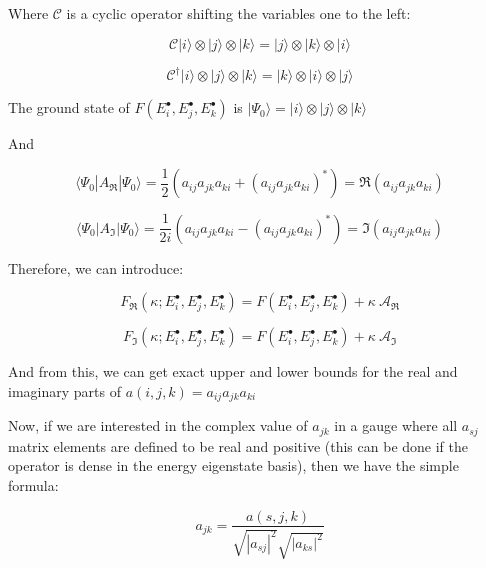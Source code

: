 \documentclass{article}
\theoremstyle{definition}
\begin{document}
Where $\mathcal{C}$ is a cyclic operator shifting the variables one to the left:

\begin{equation}
\mathcal{C} |i\rangle \otimes |j\rangle \otimes  |k\rangle
=
|j\rangle \otimes  |k\rangle \otimes |i\rangle
\end{equation}

\begin{equation}
\mathcal{C}^\dagger |i\rangle \otimes |j\rangle \otimes  |k\rangle
=
|k\rangle \otimes |i\rangle \otimes  |j\rangle
\end{equation}

The ground state of $F(E_i^\bullet,E_j^\bullet,E_k^\bullet)$ is $|\Psi_0 \rangle = |i\rangle \otimes |j\rangle \otimes  |k\rangle$

And

\begin{equation}
\langle \Psi_0 | A_\Re | \Psi_0 \rangle
=
\frac{1}{2}
\left (
a_{ij} a_{jk} a_{ki}
+
(a_{ij} a_{jk} a_{ki})^*
\right )
=
\Re(a_{ij} a_{jk} a_{ki})
\end{equation}

\begin{equation}
\langle \Psi_0 | A_\Im | \Psi_0 \rangle
=
\frac{1}{2i}
\left (
a_{ij} a_{jk} a_{ki}
-
(a_{ij} a_{jk} a_{ki})^*
\right )
=
\Im(a_{ij} a_{jk} a_{ki})
\end{equation}

Therefore, we can introduce:

\begin{equation}
F_\Re(\kappa;E_i^\bullet,E_j^\bullet,E_k^\bullet)
=
F(E_i^\bullet,E_j^\bullet,E_k^\bullet)
+
\kappa \ 
\mathcal{A}_\Re
\end{equation}

\begin{equation}
F_\Im(\kappa;E_i^\bullet,E_j^\bullet,E_k^\bullet)
=
F(E_i^\bullet,E_j^\bullet,E_k^\bullet)
+
\kappa \ 
\mathcal{A}_\Im
\end{equation}

And from this, we can get exact upper and lower bounds for the real and imaginary parts of $a(i,j,k)=a_{ij} a_{jk} a_{ki}$

Now, if we are interested in the complex value of $a_{jk}$ in a gauge where all $a_{sj}$ matrix elements are defined to be real and positive (this can be done if the operator is dense in the energy eigenstate basis), then we have the simple formula:

\begin{equation}
a_{jk} = \frac{a(s,j,k)}{\sqrt{|a_{sj}|^2} \sqrt{|a_{ks}|^2}}
\end{equation}
\end{document}
